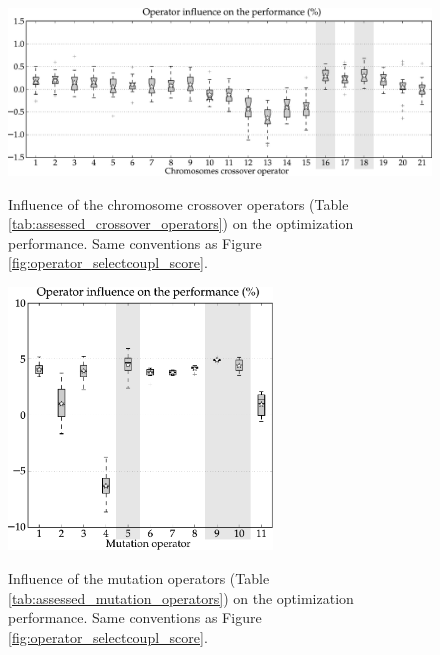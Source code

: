 \documentclass{ametsoc}
\begin{document}
\begin{figure}[t]
	\begin{center}
		\noindent\includegraphics[width=16cm,angle=0]{figures/operator_crossover_score.pdf}\\
	\end{center}
	\caption{Influence of the chromosome crossover operators (Table \ref{tab:assessed_crossover_operators}) on the optimization performance. Same conventions as Figure \ref{fig:operator_selectcoupl_score}.}
	\label{fig:operator_crossover_score}
\end{figure}

\begin{figure}[t]
	\begin{center}
		\noindent\includegraphics[width=7cm,angle=0]{figures/operator_mutation_score.pdf}\\
	\end{center}
	\caption{Influence of the mutation operators (Table \ref{tab:assessed_mutation_operators}) on the optimization performance. Same conventions as Figure \ref{fig:operator_selectcoupl_score}.}
	\label{fig:operator_mutation_score}
\end{figure}
\end{document}
